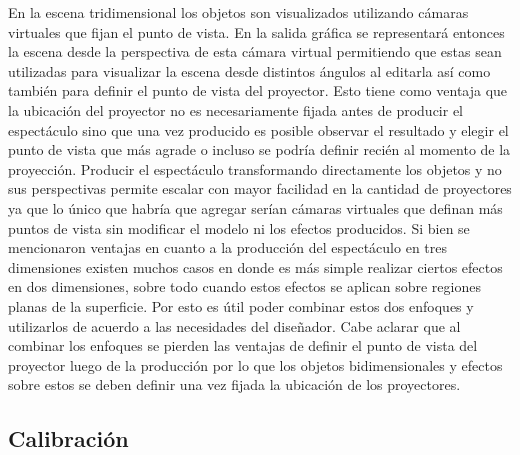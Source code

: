 En la escena tridimensional los objetos son visualizados utilizando cámaras virtuales que fijan el punto de vista. En la salida gráfica se representará entonces la escena desde la perspectiva de esta cámara virtual permitiendo que estas sean utilizadas para visualizar la escena desde distintos ángulos al editarla así como también para definir el punto de vista del proyector. Esto tiene como ventaja que la ubicación del proyector no es necesariamente fijada antes de producir el espectáculo sino que una vez producido es posible observar el resultado y elegir el punto de vista que más agrade o incluso se podría definir recién al momento de la proyección.
Producir el espectáculo transformando directamente los objetos y no sus perspectivas permite escalar con mayor facilidad en la cantidad de proyectores ya que lo único que habría que agregar serían cámaras virtuales que definan más puntos de vista sin modificar el modelo ni los efectos producidos.
Si bien se mencionaron ventajas en cuanto a la producción del espectáculo en tres dimensiones existen muchos casos en donde es más simple realizar ciertos efectos en dos dimensiones, sobre todo cuando estos efectos se aplican sobre regiones planas de la superficie. Por esto es útil poder combinar estos dos enfoques y utilizarlos de acuerdo a las necesidades del diseñador. Cabe aclarar que al combinar los enfoques se pierden las ventajas de definir el punto de vista del proyector luego de la producción por lo que los objetos bidimensionales y efectos sobre estos se deben definir una vez fijada la ubicación de los proyectores.

\subsection{Calibración}